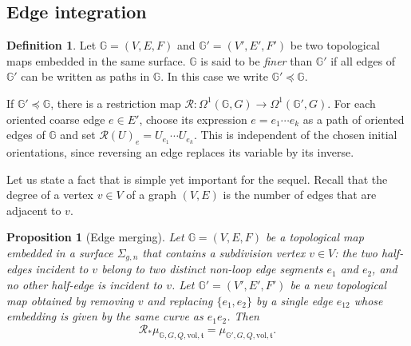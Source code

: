 \documentclass[11pt,a4paper,reqno]{article}
\newtheorem{proposition}[theorem]{Proposition}
\theoremstyle{definition}
\newtheorem{definition}[theorem]{Definition}
\theoremstyle{remark}
\newcommand\vol{\mathrm{vol}}
\newcommand\Gbb{{\mathbb{G}}}
\begin{document}
\subsection{Edge integration}

\begin{definition}
Let $\Gbb=(V,E,F)$ and $\Gbb'=(V',E',F')$ be two topological maps embedded in the same surface. $\Gbb$ is said to be \emph{finer} than $\Gbb'$ if all edges of $\Gbb'$ can be written as paths in $\Gbb$. In this case we write $\Gbb'\preceq\Gbb$.
\end{definition}

If $\Gbb'\preceq\Gbb$, there is a restriction map $\mathcal R:\Omega^1(\Gbb,G)\to\Omega^1(\Gbb',G)$. For each oriented coarse edge $e\in E'$, choose its expression $e=e_1\cdots e_k$ as a path of oriented edges of $\Gbb$ and set $\mathcal R(U)_e=U_{e_1}\cdots U_{e_k}$. This is independent of the chosen initial orientations, since reversing an edge replaces its variable by its inverse.

Let us state a fact that is simple yet important for the sequel. Recall that the degree of a vertex $v\in V$ of a graph $(V,E)$ is the number of edges that are adjacent to $v$.

\begin{proposition}[Edge merging]\label{prop:edge_fusion}
Let $\Gbb=(V,E,F)$ be a topological map embedded in a surface $\Sigma_{g,n}$ that contains a subdivision vertex $v\in V$: the two half-edges incident to $v$ belong to two distinct non-loop edge segments $e_1$ and $e_2$, and no other half-edge is incident to $v$. Let $\Gbb'=(V',E',F')$ be a new topological map obtained by removing $v$ and replacing $\{e_1,e_2\}$ by a single edge $e_{12}$ whose embedding is given by the same curve as $e_1e_2$. Then
\begin{equation}
\mathcal{R}_*\mu_{\Gbb,G,Q,\vol,\mathfrak{t}}=\mu_{\Gbb',G,Q,\vol,\mathfrak{t}}.
\end{equation}
\end{proposition}
\end{document}
